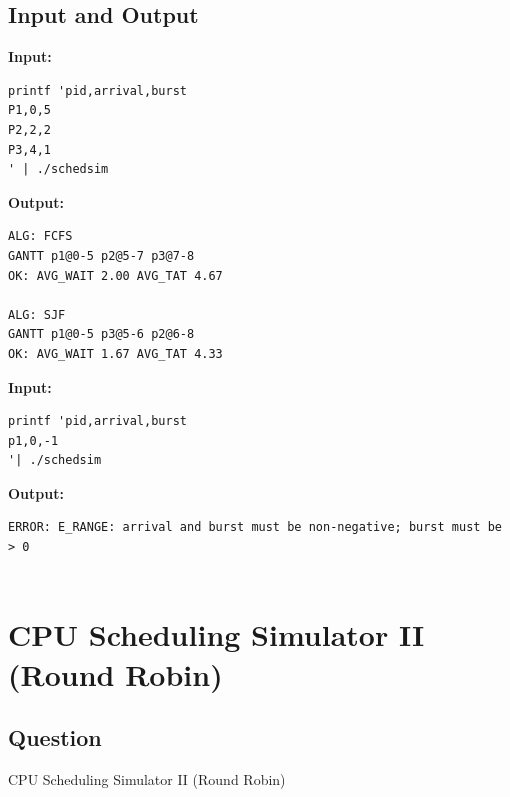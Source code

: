 \documentclass[12pt,a4paper]{article}
\begin{document}
\subsection{Input and Output}
\noindent\textbf{Input:}
\begin{verbatim}
printf 'pid,arrival,burst
P1,0,5
P2,2,2
P3,4,1
' | ./schedsim
\end{verbatim}
\vspace{0.5cm}
\noindent\textbf{Output:}
\begin{verbatim}
ALG: FCFS
GANTT p1@0-5 p2@5-7 p3@7-8 
OK: AVG_WAIT 2.00 AVG_TAT 4.67

ALG: SJF
GANTT p1@0-5 p3@5-6 p2@6-8 
OK: AVG_WAIT 1.67 AVG_TAT 4.33

\end{verbatim}
\noindent\textbf{Input:}
\begin{verbatim}
printf 'pid,arrival,burst 
p1,0,-1
'| ./schedsim

\end{verbatim}
\vspace{0.5cm}
\noindent\textbf{Output:}
\begin{verbatim}
ERROR: E_RANGE: arrival and burst must be non-negative; burst must be > 0
               

\end{verbatim}
\newpage
\section{CPU Scheduling Simulator II (Round Robin)}
\subsection{Question}
CPU Scheduling Simulator II (Round Robin)
\end{document}
